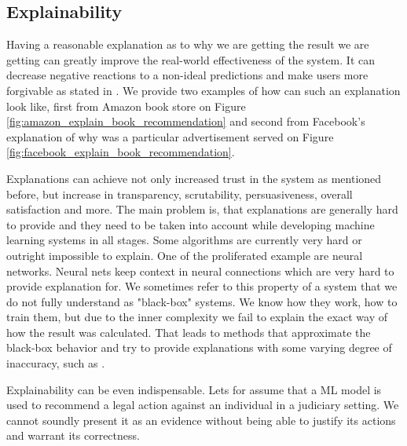 
\subsection{Explainability}
Having a reasonable explanation as to why we are getting the result we are getting can greatly improve the real-world effectiveness of the system. It can decrease negative reactions to a non-ideal predictions and make users more forgivable as stated in \cite{tintarev2007survey}. We provide two examples of how can such an explanation look like, first from Amazon book store on Figure \ref{fig:amazon_explain_book_recommendation} and second from Facebook's explanation of why was a particular advertisement served on Figure \ref{fig:facebook_explain_book_recommendation}.

Explanations can achieve not only increased trust in the system as mentioned before, but increase in transparency, scrutability, persuasiveness, overall satisfaction and more. The main problem is, that explanations are generally hard to provide and they need to be taken into account while developing machine learning systems in all stages. Some algorithms are currently very hard or outright impossible to explain. One of the proliferated example are neural networks. Neural nets keep context in neural connections which are very hard to provide explanation for. We sometimes refer to this property of a system that we do not fully understand as "black-box" systems. We know how they work, how to train them, but due to the inner complexity we fail to explain the exact way of how the result was calculated. That leads to methods that approximate the black-box behavior and try to provide explanations with some varying degree of inaccuracy, such as \cite{explaining_black_box_2021}.

Explainability can be even indispensable. Lets for assume that a ML model is used to recommend a legal action against an individual in a judiciary setting. We cannot soundly present it as an evidence without being able to justify its actions and warrant its correctness.


